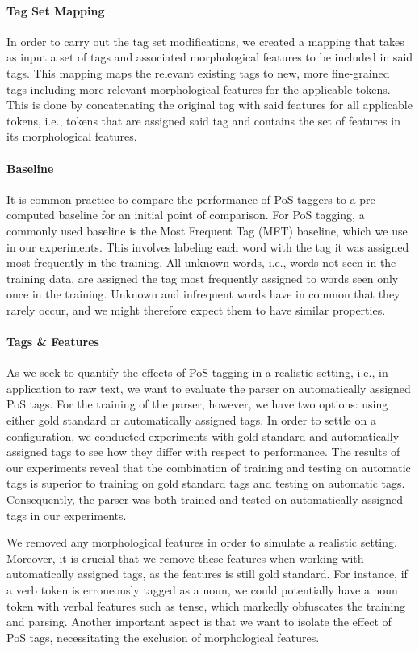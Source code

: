 \documentclass[11pt,a4paper]{article}
\begin{document}
\paragraph{Tag Set Mapping}
In order to carry out the tag set modifications, we created a mapping that
takes as input a set of tags and associated morphological features to be
included in said tags. This mapping maps the relevant existing tags to new,
more fine-grained tags including more relevant morphological features for the
applicable tokens. This is done by concatenating the original tag with said
features for all applicable tokens, i.e., tokens that are assigned said tag and
contains the set of features in its morphological features.

\paragraph{Baseline}
It is common practice to compare the performance of PoS taggers to a
pre-computed baseline for an initial point of comparison.
For PoS tagging, a commonly used baseline is the Most Frequent Tag (MFT)
baseline, which we use in our experiments. This involves labeling each word
with the tag it was assigned most frequently in the training. All unknown
words, i.e., words not seen in the training data, are assigned the tag most
frequently assigned to words seen only once in the training. Unknown and
infrequent words have in common that they rarely occur, and we might therefore
expect them to have similar properties.

\paragraph{Tags \& Features}
As we seek to quantify the effects of PoS tagging in a realistic setting, i.e.,
in application to raw text, we want to evaluate the parser on automatically
assigned PoS tags. For the training of the parser, however, we have two
options: using either gold standard or automatically assigned tags. In order to
settle on a configuration, we conducted experiments with gold standard and
automatically assigned tags to see how they differ with respect to performance.
The results of our experiments reveal that the combination of training and
testing on automatic tags is superior to training on gold standard tags and
testing on automatic tags.  Consequently, the parser was both trained and
tested on automatically assigned tags in our experiments.

We removed any morphological features in order to simulate a realistic setting.
Moreover, it is crucial that we remove these features when working with
automatically assigned tags, as the features is still gold standard.  For
instance, if a verb token is erroneously tagged as a noun, we could potentially
have a noun token with verbal features such as tense, which markedly obfuscates
the training and parsing. Another important aspect is that we want to isolate
the effect of PoS tags, necessitating the exclusion of morphological features.
\end{document}
